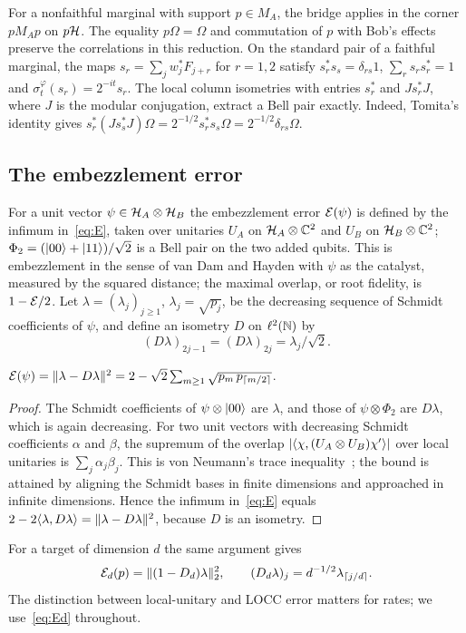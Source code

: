 For a nonfaithful marginal with support $p\in M_A$, the bridge applies in the corner
$pM_Ap$ on $p\mathcal{H}$. The equality $p\Omega=\Omega$ and commutation of $p$ with Bob's effects
preserve the correlations in this reduction. On the standard pair of a faithful marginal,
the maps $s_r=\sum_j w_j^*F_{j+r}$ for $r=1,2$ satisfy $s_r^*s_s=\delta_{rs}1$,
$\sum_rs_rs_r^*=1$ and $\sigma_t^\varphi(s_r)=2^{-it}s_r$. The local column isometries
with entries $s_r^*$ and $Js_r^*J$, where $J$ is the modular conjugation, extract a Bell
pair exactly. Indeed, Tomita's identity gives
$s_r^*(Js_s^*J)\Omega=2^{-1/2}s_r^*s_s\Omega=2^{-1/2}\delta_{rs}\Omega$.

\subsection{The embezzlement error}\label{sec:E}

For a unit vector $\psi\in\mathcal{H}_A\otimes\mathcal{H}_B$ the embezzlement error $\mathcal{E}(\psi)$ is defined by
the infimum in~\eqref{eq:E}, taken over unitaries $U_A$ on $\mathcal{H}_A\otimes\mathbb{C}^2$ and $U_B$ on
$\mathcal{H}_B\otimes\mathbb{C}^2$; $\Phi_2=(|00\rangle+|11\rangle)/\sqrt2$ is a Bell pair on the two added qubits.
This is embezzlement in the sense of van Dam and Hayden with $\psi$ as the catalyst, measured
by the squared distance; the maximal overlap, or root fidelity, is $1-\mathcal{E}/2$. Let
$\lambda=(\lambda_j)_{j\ge1}$, $\lambda_j=\sqrt{p_j}$, be the decreasing sequence of Schmidt
coefficients of $\psi$, and define an isometry $D$ on $\ell^2(\mathbb{N})$ by
\begin{equation}\label{eq:D}
(D\lambda)_{2j-1}=(D\lambda)_{2j}=\lambda_j/\sqrt2 .
\end{equation}

\begin{lemma}\label{lem:formula}
$\mathcal{E}(\psi)=\lVert \lambda-D\lambda\rVert^2=2-\sqrt2\sum_{m\ge1}\sqrt{p_m\,p_{\lceil m/2\rceil}}$.
\end{lemma}

\begin{proof}
The Schmidt coefficients of $\psi\otimes|00\rangle$ are $\lambda$, and those of
$\psi\otimes\Phi_2$ are $D\lambda$, which is again decreasing. For two unit vectors with
decreasing Schmidt coefficients $\alpha$ and $\beta$, the supremum of the overlap
$\lvert\langle \chi,(U_A\otimes U_B)\chi'\rangle\rvert$ over local unitaries is $\sum_j\alpha_j\beta_j$.
This is von Neumann's trace inequality~\cite{HornJohnson}; the bound is attained by aligning
the Schmidt bases in finite dimensions and approached in infinite dimensions. Hence the infimum
in~\eqref{eq:E} equals $2-2\langle \lambda,D\lambda\rangle=\lVert \lambda-D\lambda\rVert^2$, because $D$ is an
isometry.
\end{proof}


For a target of dimension $d$ the same argument gives
\begin{equation}\label{eq:Ed}
\mathcal{E}_d(p)=\|(1-D_d)\lambda\|_2^2,
\qquad (D_d\lambda)_j=d^{-1/2}\lambda_{\lceil j/d\rceil}.
\end{equation}
The distinction between local-unitary and LOCC error matters for rates;
we use~\eqref{eq:Ed} throughout.
